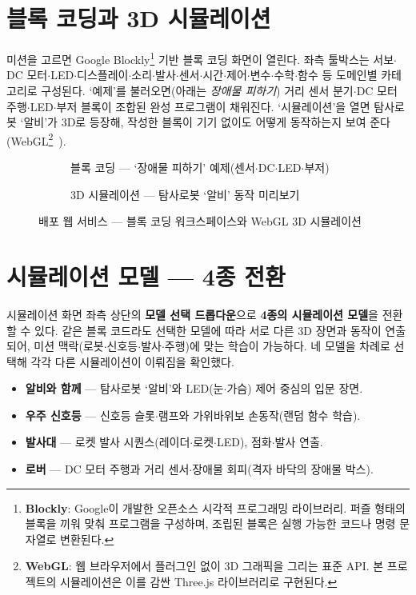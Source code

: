 \section{블록 코딩과 3D 시뮬레이션}
미션을 고르면 Google Blockly\footnote{\textbf{Blockly}: Google이 개발한 오픈소스 시각적
프로그래밍 라이브러리. 퍼즐 형태의 블록을 끼워 맞춰 프로그램을 구성하며, 조립된 블록은
실행 가능한 코드나 명령 문자열로 변환된다.} 기반 블록 코딩 화면이 열린다. 좌측 툴박스는
서보$\cdot$DC 모터$\cdot$LED$\cdot$디스플레이$\cdot$소리$\cdot$발사$\cdot$센서$\cdot$시간$\cdot$제어$\cdot$변수$\cdot$수학$\cdot$함수
등 도메인별 카테고리로 구성된다. ‘예제’를 불러오면(아래는 \emph{장애물 피하기})
거리 센서 분기$\cdot$DC 모터 주행$\cdot$LED$\cdot$부저 블록이 조합된 완성 프로그램이 채워진다.
‘시뮬레이션’을 열면 탐사로봇 ‘알비’가 3D로 등장해, 작성한 블록이 기기 없이도
어떻게 동작하는지 보여 준다(WebGL\footnote{\textbf{WebGL}: 웹 브라우저에서 플러그인 없이
3D 그래픽을 그리는 표준 API. 본 프로젝트의 시뮬레이션은 이를 감싼 Three.js 라이브러리로
구현된다.}~\cite{webgl, threejs}).

\begin{figure}[htbp]\centering
  \begin{subfigure}{0.49\linewidth}\centering
    \caption{블록 코딩 — ‘장애물 피하기’ 예제(센서$\cdot$DC$\cdot$LED$\cdot$부저)}
  \end{subfigure}\hfill
  \begin{subfigure}{0.49\linewidth}\centering
    \caption{3D 시뮬레이션 — 탐사로봇 ‘알비’ 동작 미리보기}
  \end{subfigure}
  \caption{배포 웹 서비스 — 블록 코딩 워크스페이스와 WebGL 3D 시뮬레이션}
\end{figure}

\section{시뮬레이션 모델 — 4종 전환}
시뮬레이션 화면 좌측 상단의 \textbf{모델 선택 드롭다운}으로 \textbf{4종의 시뮬레이션
모델}을 전환할 수 있다. 같은 블록 코드라도 선택한 모델에 따라 서로 다른 3D 장면과
동작이 연출되어, 미션 맥락(로봇$\cdot$신호등$\cdot$발사$\cdot$주행)에 맞는 학습이 가능하다.
네 모델을 차례로 선택해 각각 다른 시뮬레이션이 이뤄짐을 확인했다.

\begin{itemize}
  \item \textbf{알비와 함께} — 탐사로봇 ‘알비’와 LED(눈$\cdot$가슴) 제어 중심의 입문 장면.
  \item \textbf{우주 신호등} — 신호등 슬롯$\cdot$램프와 가위바위보 손동작(랜덤 함수 학습).
  \item \textbf{발사대} — 로켓 발사 시퀀스(레이더$\cdot$로켓$\cdot$LED), 점화$\cdot$발사 연출.
  \item \textbf{로버} — DC 모터 주행과 거리 센서$\cdot$장애물 회피(격자 바닥의 장애물 박스).
\end{itemize}

